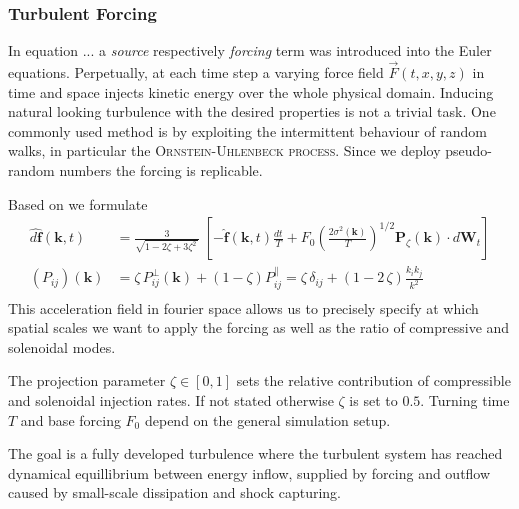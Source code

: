 \subsubsection{Turbulent Forcing}
\label{sec-theory:turbulent-forcing}

In equation ... a \emph{source} respectively \emph{forcing} term was introduced
into the Euler equations. Perpetually, at each time step a varying force field
$\vec{F}(t,x,y,z)$ in time and space injects kinetic energy over the whole
physical domain. Inducing natural looking turbulence with the desired
properties is not a trivial task. One commonly used method is by exploiting the
intermittent behaviour of random walks, in particular the
\textsc{Ornstein-Uhlenbeck process}. Since we deploy pseudo-random numbers
the forcing is replicable.

Based on \cite{schmidt2009} we formulate
\begin{align}
  \hat{d\mathbf{f}}(\mathbf{k},t) &= \frac{3}{\sqrt{1-2\zeta+3\zeta^2\,}}\;\left[-\hat{\mathbf{f}}(\mathbf{k},t)\frac{dt}{T} + F_0 \left(\frac{2\sigma^2(\mathbf{k})}{T}\right)^{1/2}\mathbf{P}_\zeta(\mathbf{k})\cdot d\mathbf{W}_t\right]\\
  (P_{ij})(\mathbf{k}) &= \zeta\,P_{ij}^\perp(\mathbf{k}) + (1-\zeta) P_{ij}^\parallel =\zeta\,\delta_{ij} + (1-2\,\zeta) \frac{k_i k_j}{k^2}\\
\end{align}
This acceleration field in fourier space allows us to precisely specify at
which spatial scales we want to apply the forcing as well as the ratio of
compressive and solenoidal modes.

The projection parameter $\zeta \in [0,1]$ sets the relative contribution of
compressible and solenoidal injection rates. If not stated otherwise $\zeta$ is
set to $0.5$. Turning time $T$ and base forcing $F_0$ depend on the general
simulation setup.

The goal is a fully developed turbulence where the turbulent system has reached dynamical equillibrium between
energy inflow, supplied by forcing and outflow caused by small-scale dissipation and shock capturing.
